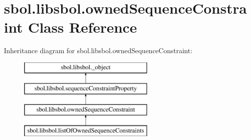 \hypertarget{classsbol_1_1libsbol_1_1owned_sequence_constraint}{}\section{sbol.\+libsbol.\+owned\+Sequence\+Constraint Class Reference}
\label{classsbol_1_1libsbol_1_1owned_sequence_constraint}
Inheritance diagram for sbol.\+libsbol.\+owned\+Sequence\+Constraint\+:\begin{figure}[H]
\begin{center}
\leavevmode
\includegraphics[height=4.000000cm]{classsbol_1_1libsbol_1_1owned_sequence_constraint}
\end{center}
\end{figure}
